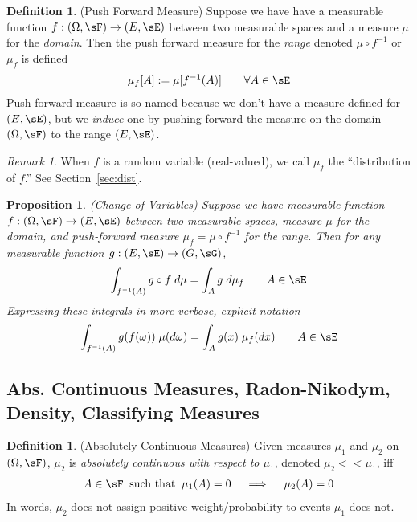 \documentclass[12pt]{article}
\theoremstyle{plain}
\newtheorem{prop}[thm]{Proposition}
\theoremstyle{definition}
\newtheorem{defn}[thm]{Definition}
\theoremstyle{remark}
\newtheorem*{rmk}{Remark}
\newcommand{\ra}{\rightarrow}
\begin{document}
\begin{defn}(Push Forward Measure)
\label{defn:pushfwd}
Suppose we have have a measurable function $f:(\Omega,\sF)\ra (E,\sE)$
between two measurable spaces and a measure $\mu$ for the \emph{domain}.
Then the push forward measure for the \emph{range} denoted $\mu \circ
f^{-1}$ or $\mu_f$ is defined
\begin{align*}
  \mu_f[A] := \mu[f^{-1}(A)]
  \qquad\forall A \in\sE
\end{align*}
Push-forward measure is so named because we don't have a measure
defined for $(E,\sE)$, but we \emph{induce} one by pushing forward the
measure on the domain $(\Omega,\sF)$ to the range $(E,\sE)$.
\end{defn}
\begin{rmk}
When $f$ is a random variable (real-valued), we call $\mu_f$ the
``distribution of $f$.'' See Section~\ref{sec:dist}.
\end{rmk}

\begin{prop}\emph{(Change of Variables)}
\label{prop:changeofvars}
Suppose we have measurable function $f:(\Omega,\sF)\ra (E,\sE)$ between
two measurable spaces, measure $\mu$ for the \emph{domain},
and push-forward measure $\mu_f=\mu \circ f^{-1}$ for the range. Then
for any measurable function $g:(E,\sE)\ra(G,\sG)$,
\begin{align*}
  \int_{f^{-1}(A)} g\circ f \; d\mu
  =
  \int_A g\;d\mu_f
  \qquad A \in \sE
\end{align*}
Expressing these integrals in more verbose, explicit notation
\begin{align*}
  \int_{f^{-1}(A)} g(f(\omega)) \; \mu(d\omega)
  =
  \int_A g(x)\;\mu_f(dx)
  \qquad A \in \sE
\end{align*}
\end{prop}


\clearpage
\subsection{%
  Abs. Continuous Measures, Radon-Nikodym, Density,
  Classifying Measures
}
\label{sec:abscts}

\begin{defn}(Absolutely Continuous Measures)
Given measures $\mu_1$ and $\mu_2$ on $(\Omega,\sF)$,
$\mu_2$ is \emph{absolutely continuous with respect to $\mu_1$}, denoted
$\mu_2<<\mu_1$, iff
\begin{align*}
  A\in\sF\;\;\text{such that}\;\;
  \mu_1(A) = 0
  \quad\implies\quad
  \mu_2(A) = 0
\end{align*}
In words, $\mu_2$ does not assign positive weight/probability to events
$\mu_1$ does not.
\end{defn}
\end{document}
